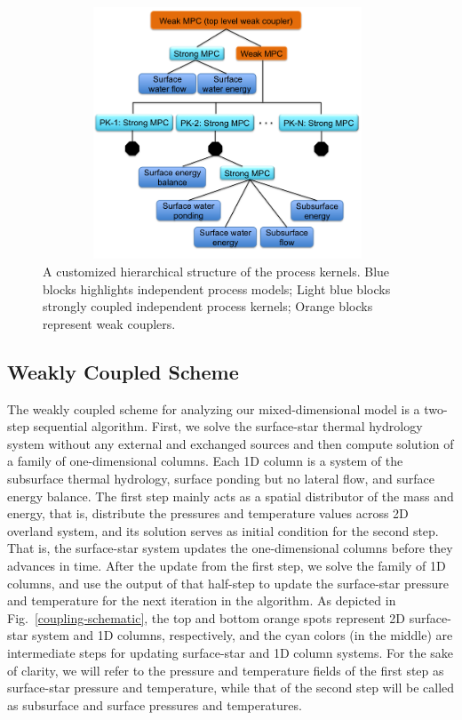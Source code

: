 \documentclass[review]{elsarticle}
\begin{document}
\begin{figure}[!htpb]
\centering
\includegraphics[height = 7.5cm, width=11cm]{figures/process-tree1.png}
\caption{A customized hierarchical structure of the process kernels. Blue blocks highlights independent process models; Light blue blocks strongly coupled independent process kernels; Orange blocks represent weak couplers.}
\label{pk-tree}
\end{figure}


\subsection{Weakly Coupled Scheme}
The weakly coupled scheme for analyzing our mixed-dimensional model is a two-step sequential algorithm. First, we solve the surface-star thermal hydrology system without any external and exchanged sources and then compute solution of a family of one-dimensional columns. Each 1D column is a system of the subsurface thermal hydrology, surface ponding but no lateral flow, and surface energy balance. The first step mainly acts as a spatial distributor of the mass and energy, that is, distribute the pressures and temperature values across 2D overland system, and its solution serves as initial condition for the second step. That is, the surface-star system updates the one-dimensional columns before they advances in time. After the update from the first step, we solve the family of 1D columns, and use the output of that half-step to update the surface-star pressure and temperature for the next iteration in the algorithm. As depicted in Fig.~\ref{coupling-schematic}, the top and bottom orange spots represent 2D surface-star system and 1D columns, respectively, and the cyan colors (in the middle) are intermediate steps for updating surface-star and 1D column systems. For the sake of clarity, we will refer to the pressure and temperature fields of the first step as surface-star pressure and temperature, while that of the second step will be called as subsurface and surface pressures and temperatures.
\end{document}
